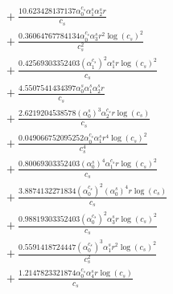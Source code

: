 \documentclass[10pt]{article}
\begin{document}
\begin{align*}
&{}  + \frac{10.623428137137 \alpha_{0}^{c_s} \alpha_{1}^s \alpha_{2}^s r}{c_{s}} \\
&{}  + \frac{0.36064767784134 \alpha_{0}^{c_s} \alpha_{3}^s r^{2} \log{\left(c_{s} \right)}^{2}}{c_{s}^{2}} \\
&{}  + \frac{0.42569303352403 \left(\alpha_{1}^{c_s}\right)^{2} \alpha_{1}^s r \log{\left(c_{s} \right)}^{2}}{c_{s}} \\
&{}  + \frac{4.5507541434397 \alpha_{0}^s \alpha_{1}^s \alpha_{2}^s r}{c_{s}} \\
&{}  + \frac{2.6219204538578 \left(\alpha_{0}^s\right)^{3} \alpha_{2}^{c_s} r \log{\left(c_{s} \right)}}{c_{s}} \\
&{}  + \frac{0.049066752095252 \alpha_{0}^{c_s} \alpha_{1}^s r^{4} \log{\left(c_{s} \right)}^{2}}{c_{s}^{4}} \\
&{}  + \frac{0.80069303352403 \left(\alpha_{0}^s\right)^{4} \alpha_{1}^{c_s} r \log{\left(c_{s} \right)}^{2}}{c_{s}} \\
&{}  + \frac{3.8874132271834 \left(\alpha_{0}^{c_s}\right)^{2} \left(\alpha_{0}^s\right)^{4} r \log{\left(c_{s} \right)}}{c_{s}} \\
&{}  + \frac{0.98819303352403 \left(\alpha_{0}^{c_s}\right)^{2} \alpha_{3}^s r \log{\left(c_{s} \right)}^{2}}{c_{s}} \\
&{}  + \frac{0.5591418724447 \left(\alpha_{0}^{c_s}\right)^{3} \alpha_{1}^s r^{2} \log{\left(c_{s} \right)}^{2}}{c_{s}^{2}} \\
&{}  + \frac{1.2147823321874 \alpha_{0}^{c_s} \alpha_{4}^s r \log{\left(c_{s} \right)}}{c_{s}}
\end{align*}
\end{document}
